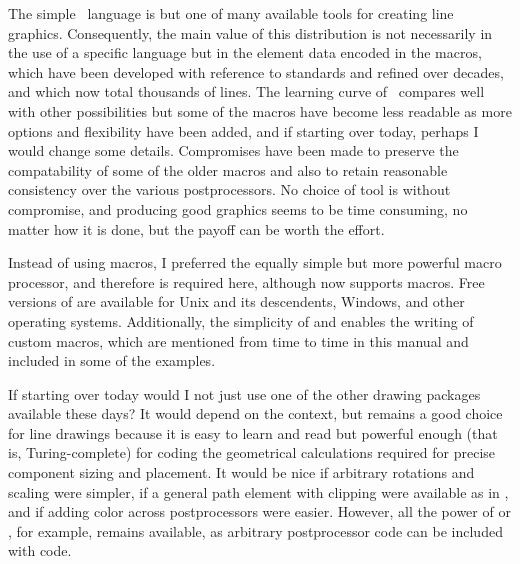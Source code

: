 The simple \pic\ language is but one of many available tools for creating
line graphics.  Consequently, the main value of this distribution is
not necessarily in the use of a specific language but in the element
data encoded in the macros, which have been developed with reference
to standards and refined over decades, and which now total thousands of
lines.  The learning curve of \pic\ compares well with other possibilities
but some of the macros have become less readable as more options and
flexibility have been added, and if starting over today, perhaps I
would change some details.  Compromises have been made to preserve the
compatability of some of the older macros and also to retain reasonable
consistency over the various postprocessors.  No choice of tool is without
compromise, and producing good graphics seems to be time consuming,
no matter how it is done, but the payoff can be worth the effort.

Instead of using \pic macros, I preferred the equally simple but more
powerful \Mfour macro processor, and therefore \Mfour is required here,
although \dpic  now supports \pic macros.  Free versions of \Mfour
are available for Unix and its descendents, Windows, and other operating
systems.  Additionally, the simplicity of \Mfour and \pic enables the
writing of custom macros, which are mentioned from time to time in this
manual and included in some of the examples.

If starting over today would I not just use one of the other drawing
packages available these days?  It would depend on the context, but
\pic remains a good choice for line drawings because it is easy to learn
and read but powerful enough (that is, Turing-complete) for coding the
geometrical calculations required for precise component sizing and
placement. It would be nice if arbitrary rotations and scaling were
simpler, if a general path element with clipping were available as in
\Postscript, and if adding color across postprocessors were easier.
However, all the power of \Postscript or \TPGF, for example, remains
available, as arbitrary postprocessor code can be included with \pic code.

